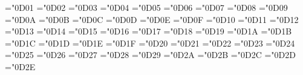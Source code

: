 \def\mDiscretionaryHyphen{\@unicode{DiscretionaryHyphen}}
\mathchardef\CapitalAlpha ="0D01
\let\mCapitalAlpha=\CapitalAlpha 
\mathchardef\CapitalBeta ="0D02
\let\mCapitalBeta=\CapitalBeta 
\mathchardef\Gamma ="0D03
\let\mCapitalGamma=\Gamma 
\mathchardef\Delta ="0D04
\let\mCapitalDelta=\Delta 
\mathchardef\CapitalEpsilon ="0D05
\let\mCapitalEpsilon=\CapitalEpsilon 
\mathchardef\CapitalZeta ="0D06
\let\mCapitalZeta=\CapitalZeta 
\mathchardef\CapitalEta ="0D07
\let\mCapitalEta=\CapitalEta 
\mathchardef\Theta ="0D08
\let\mCapitalTheta=\Theta 
\mathchardef\CapitalIota ="0D09
\let\mCapitalIota=\CapitalIota 
\mathchardef\CapitalKappa ="0D0A
\let\mCapitalKappa=\CapitalKappa 
\mathchardef\Lambda ="0D0B
\let\mCapitalLambda=\Lambda 
\mathchardef\CapitalMu ="0D0C
\let\mCapitalMu=\CapitalMu 
\mathchardef\CapitalNu ="0D0D
\let\mCapitalNu=\CapitalNu 
\mathchardef\Xi ="0D0E
\let\mCapitalXi=\Xi 
\mathchardef\CapitalOmicron ="0D0F
\let\mCapitalOmicron=\CapitalOmicron 
\mathchardef\Pi ="0D10
\let\mCapitalPi=\Pi 
\mathchardef\CapitalRho ="0D11
\let\mCapitalRho=\CapitalRho 
\mathchardef\Sigma ="0D12
\let\mCapitalSigma=\Sigma 
\mathchardef\CapitalTau ="0D13
\let\mCapitalTau=\CapitalTau 
\mathchardef\Upsilon ="0D14
\let\mCapitalUpsilon=\Upsilon 
\mathchardef\CurlyCapitalUpsilon ="0D15
\let\mCurlyCapitalUpsilon=\CurlyCapitalUpsilon 
\mathchardef\Phi ="0D16
\let\mCapitalPhi=\Phi 
\mathchardef\CapitalChi ="0D17
\let\mCapitalChi=\CapitalChi 
\mathchardef\Psi ="0D18
\let\mCapitalPsi=\Psi 
\mathchardef\Omega ="0D19
\let\mCapitalOmega=\Omega 
\mathchardef\CapitalDigamma ="0D1A
\let\mCapitalDigamma=\CapitalDigamma 
\mathchardef\CapitalStigma ="0D1B
\let\mCapitalStigma=\CapitalStigma 
\mathchardef\CapitalKoppa ="0D1C
\let\mCapitalKoppa=\CapitalKoppa 
\mathchardef\CapitalSampi ="0D1D
\let\mCapitalSampi=\CapitalSampi 
\mathchardef\alpha ="0D1E
\let\mAlpha=\alpha 
\mathchardef\beta ="0D1F
\let\mBeta=\beta 
\mathchardef\gamma ="0D20
\let\mGamma=\gamma 
\mathchardef\delta ="0D21
\let\mDelta=\delta 
\mathchardef\epsilon ="0D22
\let\mEpsilon=\epsilon 
\mathchardef\varepsilon ="0D23
\let\mCurlyEpsilon=\varepsilon 
\mathchardef\zeta ="0D24
\let\mZeta=\zeta 
\mathchardef\eta ="0D25
\let\mEta=\eta 
\mathchardef\theta ="0D26
\let\mTheta=\theta 
\mathchardef\vartheta ="0D27
\let\mCurlyTheta=\vartheta 
\mathchardef\iota ="0D28
\let\mIota=\iota 
\mathchardef\kappa ="0D29
\let\mKappa=\kappa 
\mathchardef\CurlyKappa ="0D2A
\let\mCurlyKappa=\CurlyKappa 
\mathchardef\lambda ="0D2B
\let\mLambda=\lambda 
\mathchardef\mu ="0D2C
\let\mMu=\mu 
\mathchardef\nu ="0D2D
\let\mNu=\nu 
\mathchardef\xi ="0D2E
\let\mXi=\xi 
